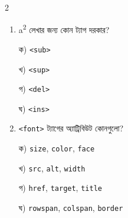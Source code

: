 \begin{multicols}{2}
\begin{enumerate}[leftmargin=*,itemsep=5pt]
\item \begin{minipage}[t]{\linewidth}\vspace{0pt}
a\textsuperscript{2} লেখার জন্য কোন ট্যাগ দরকার?
\par ক) \texttt{<sub>}
\par খ) \texttt{<sup>}
\par গ) \texttt{<del>}
\par ঘ) \texttt{<ins>}
\end{minipage}

\item \begin{minipage}[t]{\linewidth}\vspace{0pt}
\texttt{<font>} ট্যাগের অ্যাট্রিবিউট কোনগুলো?
\par ক) \texttt{size}, \texttt{color}, \texttt{face}
\par খ) \texttt{src}, \texttt{alt}, \texttt{width}
\par গ) \texttt{href}, \texttt{target}, \texttt{title}
\par ঘ) \texttt{rowspan}, \texttt{colspan}, \texttt{border}
\end{minipage}
\end{enumerate}
\end{multicols}

